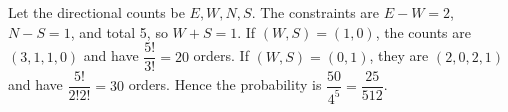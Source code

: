 Let the directional counts be $ E,W,N,S $. The constraints are $ E-W=2 $, $ N-S=1 $, and total 5, so $ W+S=1 $. If $(W,S)=(1,0)$, the counts are $(3,1,1,0)$ and have $\dfrac{5!}{3!}=20 $ orders. If $(W,S)=(0,1)$, they are $(2,0,2,1)$ and have $\dfrac{5!}{2!2!}=30 $ orders. Hence the probability is $\dfrac{50}{4^5}=\boxed{\dfrac{25}{512}}$.
